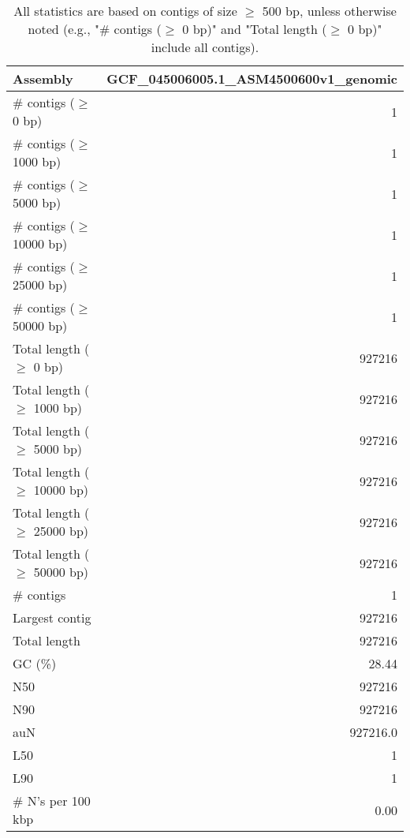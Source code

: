 \documentclass[12pt,a4paper]{article}
\begin{document}
\begin{table}[ht]
\begin{center}
\caption{All statistics are based on contigs of size $\geq$ 500 bp, unless otherwise noted (e.g., "\# contigs ($\geq$ 0 bp)" and "Total length ($\geq$ 0 bp)" include all contigs).}
\begin{tabular}{|l*{1}{|r}|}
\hline
Assembly & GCF\_045006005.1\_ASM4500600v1\_genomic \\ \hline
\# contigs ($\geq$ 0 bp) & 1 \\ \hline
\# contigs ($\geq$ 1000 bp) & 1 \\ \hline
\# contigs ($\geq$ 5000 bp) & 1 \\ \hline
\# contigs ($\geq$ 10000 bp) & 1 \\ \hline
\# contigs ($\geq$ 25000 bp) & 1 \\ \hline
\# contigs ($\geq$ 50000 bp) & 1 \\ \hline
Total length ($\geq$ 0 bp) & 927216 \\ \hline
Total length ($\geq$ 1000 bp) & 927216 \\ \hline
Total length ($\geq$ 5000 bp) & 927216 \\ \hline
Total length ($\geq$ 10000 bp) & 927216 \\ \hline
Total length ($\geq$ 25000 bp) & 927216 \\ \hline
Total length ($\geq$ 50000 bp) & 927216 \\ \hline
\# contigs & 1 \\ \hline
Largest contig & 927216 \\ \hline
Total length & 927216 \\ \hline
GC (\%) & 28.44 \\ \hline
N50 & 927216 \\ \hline
N90 & 927216 \\ \hline
auN & 927216.0 \\ \hline
L50 & 1 \\ \hline
L90 & 1 \\ \hline
\# N's per 100 kbp & 0.00 \\ \hline
\end{tabular}
\end{center}
\end{table}
\end{document}
